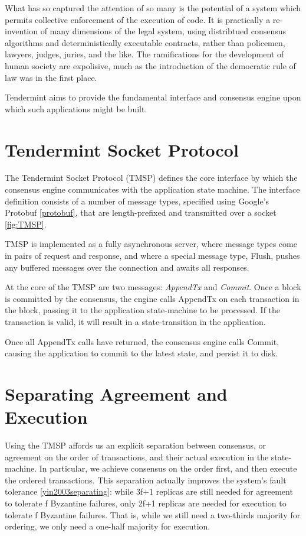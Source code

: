 What has so captured the attention of so many is the potential of a system which permits collective enforcement of the execution of code.
It is practically a re-invention of many dimensions of the legal system, using distribtued consensus algorithms and deterministically executable contracts,
rather than policemen, lawyers, judges, juries, and the like.
The ramifications for the development of human society are expolisive, much as the introduction of the democratic rule of law was in the first place.

Tendermint aims to provide the fundamental interface and consensus engine upon which such applications might be built.

\section{Tendermint Socket Protocol}

The Tendermint Socket Protocol (TMSP) defines the core interface by which the consensus engine communicates with the application state machine.
The interface definition consists of a number of message types, specified using Google's Protobuf \ref{protobuf}, 
that are length-prefixed and transmitted over a socket \ref{fig:TMSP}.

TMSP is implemented as a fully asynchronous server, 
where message types come in pairs of request and response,
and where a special message type, Flush, pushes any buffered messages over the connection and awaits all responses.

At the core of the TMSP are two messages: \emph{AppendTx} and \emph{Commit}.
Once a block is committed by the consensus, 
the engine calls AppendTx on each transaction in the block, 
passing it to the application state-machine to be processed.
If the transaction is valid, it will result in a state-transition in the application.

Once all AppendTx calls have returned, the consensus engine calls Commit,
causing the application to commit to the latest state, and persist it to disk.

\section{Separating Agreement and Execution}

Using the TMSP affords us an explicit separation between consensus, or agreement on the order of transactions, 
and their actual execution in the state-machine.
In particular, we achieve consensus on the order first, and then execute the ordered transactions.
This separation actually improves the system's fault tolerance \ref{yin2003separating}:
while 3f+1 replicas are still needed for agreement to tolerate f Byzantine failures, 
only 2f+1 replicas are needed for execution to tolerate f Byzantine failures.
That is, while we still need a two-thirds majority for ordering, we only need a one-half majority for execution.

